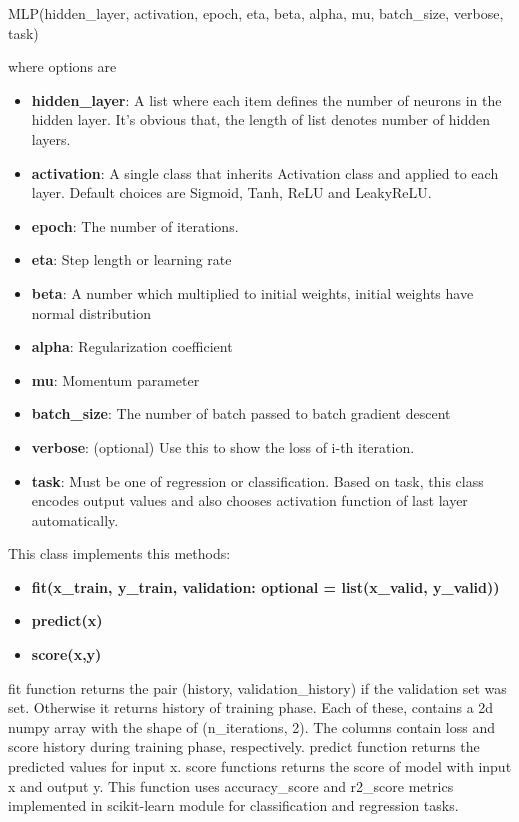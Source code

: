 \documentclass[10pt]{SelfArx} %
\begin{document}
\begin{python}
MLP(hidden_layer, activation,
    epoch, eta, beta, alpha, mu,
    batch_size, verbose, task)
\end{python}
where options are
\begin{itemize}
\item \textbf{hidden\_layer}: A list where each item defines the number of neurons in the hidden layer. It's obvious that, the length of list denotes number of hidden layers.
\item \textbf{activation}: A single class that inherits Activation class and applied to each layer. Default choices are Sigmoid, Tanh, ReLU and LeakyReLU.
\item \textbf{epoch}: The number of iterations.
\item \textbf{eta}: Step length or learning rate
\item \textbf{beta}: A number which multiplied to initial weights, initial weights have normal distribution
\item \textbf{alpha}: Regularization coefficient
\item \textbf{mu}: Momentum parameter
\item \textbf{batch\_size}: The number of batch passed to batch gradient descent
\item \textbf{verbose}: (optional) Use this to show the loss of i-th iteration.

\item \textbf{task}: Must be one of regression or classification. Based on task, this class encodes output values and also chooses activation function of last layer automatically.
\end{itemize}
This class implements this methods:
\begin{itemize}
\item  \textbf{fit(x\_train, y\_train, validation: optional = list(x\_valid, y\_valid))}
\item  \textbf{predict(x)}
\item  \textbf{score(x,y)
}
\end{itemize}
fit function returns the pair (history, validation\_history) if the validation set was set. Otherwise it returns history of training phase. Each of these, contains a 2d numpy array with the shape of (n\_iterations, 2). The columns contain loss and score history during training phase, respectively.
predict function returns the predicted values for input x.
score functions returns the score of model with input x and output y. This function uses accuracy\_score and r2\_score metrics implemented in scikit-learn module for classification and regression tasks.
\end{document}
